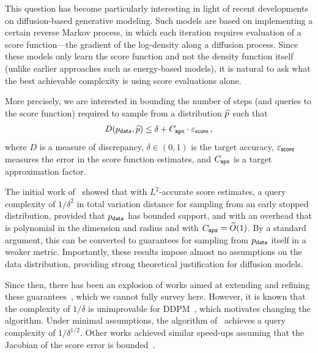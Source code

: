 \documentclass{article} %
\begin{document}
This question has become particularly interesting in light of recent developments on diffusion-based generative modeling.
Such models are based on implementing a certain reverse Markov process, in which each iteration requires evaluation of a score function---the gradient of the log-density along a diffusion process.
Since these models only learn the score function and not the density function itself (unlike earlier approaches such as energy-based models), it is natural to ask what the best achievable complexity is using score evaluations alone.

More precisely, we are interested in bounding the number of steps (and queries to the score function) required to sample from a distribution $\widehat{p}$ such that
\begin{align*}
  D(p_{\mathsf{data}},\widehat{p})\leq \delta+ C_{\texttt{apx}}\cdot  \varepsilon_{\mathsf{score}}\,,
\end{align*}
where $D$ is a measure of discrepancy, $\delta\in(0,1)$ is the target accuracy, $\varepsilon_{\mathsf{score}}$ measures the error in the score function estimates, and $C_{\texttt{apx}}$ is a target approximation factor.


The initial work of~\citet{Chen+23SGM, LeeLuTan23SGMGeneral} showed that with $L^2$-accurate score estimates,  a query complexity of $1/\delta^2$ in total variation distance for sampling from an early stopped distribution, provided that $p_{\mathsf{data}}$ has bounded support, and with an overhead that is polynomial in the dimension and radius and with $C_{\texttt{apx}} = \widetilde{O}(1)$.
By a standard argument, this can be converted to guarantees for sampling from $p_{\mathsf{data}}$ itself in a weaker metric.
Importantly, these results impose almost no assumptions on the data distribution, providing strong theoretical justification for diffusion models. 


Since then, there has been an explosion of works aimed at extending and refining these guarantees~\citep[e.g.,][]{chen2023improved,li2023towards,Ben+24Diffusion,gao2025wasserstein,ConDurSil25KLDiffusion,JaiZha25SharpKL,LiYan25Diffusion,Chen+23FlowODE,li2024sharp,gao2024convergence,huang2025convergence}, which we cannot fully survey here.
However, it is known that the complexity of $1/\delta$ is unimprovable for DDPM~\citep{jiao2025optimal}, which motivates changing the algorithm.
Under minimal assumptions, the algorithm of~\citet{li2024provable} achieves a query complexity of $1/\delta^{1/2}$.
Other works achieved similar speed-ups assuming that the Jacobian of the score error is bounded~\citep{li2024accelerating,li2025faster}.
\end{document}
